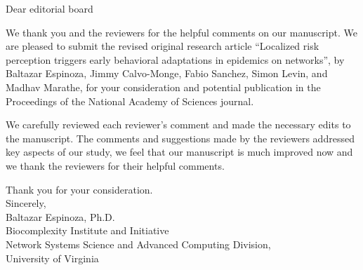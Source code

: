 \documentclass{article}
\begin{document}


\begin{flushleft}

Dear editorial board\\[10ex]

\end{flushleft}

\noindent We thank you and the reviewers for the helpful comments on our manuscript. We are pleased to submit the revised original research article ``Localized risk perception triggers early behavioral adaptations in epidemics on networks'',  by Baltazar Espinoza, Jimmy Calvo-Monge, Fabio Sanchez, Simon Levin, and Madhav Marathe, for your consideration and potential publication in the Proceedings of the National Academy of Sciences journal.\vspace{0.3cm}

\noindent We carefully reviewed each reviewer's comment and made the necessary edits to the manuscript. The comments and suggestions made by the reviewers addressed key aspects of our study, we feel that our manuscript is much improved now and we thank the reviewers for their helpful comments.\vspace{0.3cm}




\begin{flushleft}
Thank you for your consideration.\\[10ex]
Sincerely, \\[10ex]
Baltazar Espinoza, Ph.D.\\
Biocomplexity Institute and Initiative\\
Network Systems Science and Advanced Computing Division,\\ University of Virginia
\end{flushleft}


\end{document}
